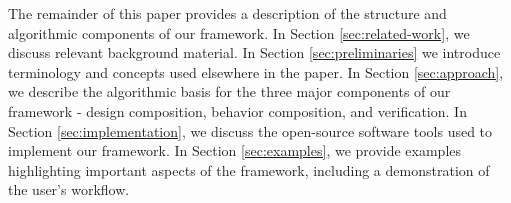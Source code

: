 \documentclass[graybox]{svmult}
\begin{document}
The remainder of this paper provides a  description of the
structure and algorithmic components of our framework.  In Section \ref{sec:related-work},
we discuss relevant background material.
In Section \ref{sec:preliminaries} we introduce terminology and  concepts used elsewhere in the
paper. 
In Section \ref{sec:approach}, we describe the algorithmic basis
for the three major components of our framework - design composition, behavior
composition, and verification.  In Section
\ref{sec:implementation}, we discuss the open-source software
tools used to implement our framework. In Section \ref{sec:examples}, we provide examples highlighting
important aspects of the framework, including a demonstration of the user's
workflow.
% 
\end{document}
